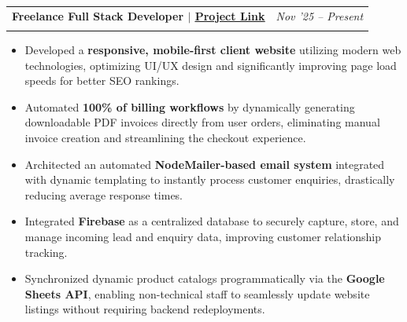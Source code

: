 \documentclass[a4paper, 10pt]{article}
\makeatletter
\newcommand{\cvlink}[2]{\href{#1}{\textcolor{headerblue}{\uline{#2}}}}
\newcommand{\expentry}[4]{
    \noindent\begin{tabularx}{\linewidth}{@{} X r @{}}
        \textbf{\color{headerblue}#1} & \textit{#2} \\
        \textit{#3} & \textit{#4} \\
    \end{tabularx}
    \par\vspace{-10pt}
}
\makeatother
\begin{document}
\expentry{Freelance Full Stack Developer $|$ \cvlink{https://varanasitoursindia.com/}{Project Link}}{Nov '25 – Present}{}{}

\begin{itemize}
\item Developed a \textbf{responsive, mobile-first client website} utilizing modern web technologies, optimizing UI/UX design and significantly improving page load speeds for better SEO rankings.
\item Automated \textbf{100\% of billing workflows} by dynamically generating downloadable PDF invoices directly from user orders, eliminating manual invoice creation and streamlining the checkout experience.
\item Architected an automated \textbf{NodeMailer-based email system} integrated with dynamic templating to instantly process customer enquiries, drastically reducing average response times.
\item Integrated \textbf{Firebase} as a centralized database to securely capture, store, and manage incoming lead and enquiry data, improving customer relationship tracking.
\item Synchronized dynamic product catalogs programmatically via the \textbf{Google Sheets API}, enabling non-technical staff to seamlessly update website listings without requiring backend redeployments.
\end{itemize}

\end{document}
